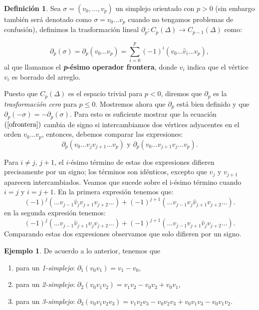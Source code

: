 \documentclass[12pt]{book}
\theoremstyle{definition}
\newtheorem{definition}[theorem]{Definición}
\newtheorem{example}[theorem]{Ejemplo}
\newcounter{in}
\newcounter{ini}
\begin{document}
\begin{definition}
  Sea $\sigma=(v_{0},\ldots ,v_{p})$ un simplejo orientado con $p>0$
  (sin embargo también será denotado como $\sigma=v_{0}\ldots v_{p}$
  cuando no tengamos problemas de confusión),
  definimos la trasformación lineal $\partial_{p}:C_{p}(\Delta)\rightarrow
  C_{p-1}(\Delta)$ como:

  \begin{equation}
    \label{ofrontera}
    \partial_{p}(\sigma)=\partial_{p}(v_{0}\ldots
    v_{p})=\sum^{p}_{i=0}(-1)^{i}(v_{0}\ldots \widehat v_{i}\ldots v_{p}),
  \end{equation}
  al que llamamos el \textbf{\emph{p}-ésimo operador frontera}, donde
  $\widehat v_{i}$ indica que el vértice $v_{i}$ es borrado del arreglo.
\end{definition}

Puesto que $C_{p}(\Delta)$ es el espacio trivial para $p<0$, diremos
que $\partial_{p}$ es la \textit{trasformación cero} para $p\leq
0$. Mostremos ahora que $\partial_{p}$ está bien definido y que
$\partial_{p}(-\sigma)=-\partial_{p}(\sigma)$. Para esto es suficiente
mostrar que la ecuación $(\ref{ofrontera})$ cambia de signo si intercambiamos dos
vértices adyacentes en el orden $v_{0}\ldots v_{p}$, entonces,
debemos comparar las expresiones:
$$\partial_{p}(v_{0}\ldots v_{j} v_{j+1} \ldots v_{p}) \mbox{ y } \partial_{p}(v_{0}\ldots v_{j+1} v_{j} \ldots v_{p}).$$

Para $i\neq j$, $j+1$, el $i$-ésimo término de estas dos expresiones
difieren precisamente por un signo; los términos son idénticos,
excepto que $v_{j}$ y $v_{j+1}$ aparecen intercambiados. Veamos que
sucede sobre el i-ésimo término cuando $i=j$ y $i=j+1$. En la primera
expresión tenemos que:
$$(-1)^{j}(\ldots v_{j-1} \widehat v_{j}v_{j+1}v_{j+2}\ldots)+(-1)^{j+1}(\ldots v_{j-1}v_{j}\widehat v_{j+1}v_{j+2}\ldots).$$
en la segunda expresión tenemos:
$$(-1)^{j}(\ldots v_{j-1}\widehat v_{j+1}v_{j}v_{j+2}\ldots)+(-1)^{j+1}(\ldots v_{j-1}v_{j+1}\widehat v_{j}v_{j+2}\ldots).$$
Comparando estas dos expresiones observamos que solo difieren por un signo.

\begin{example}
  De acuerdo a lo anterior, tenemos que
  \begin{enumerate}
  \item para un \emph{1-simplejo}: $\partial_{1}(v_{0}v_{1})= v_{1}-v_{0}$,
  \item para un \emph{2-simplejo}: $\partial_{2}(v_{0}v_{1}v_{2})=v_{1}v_{2}-v_{0}v_{2}+v_{0}v_{1}$,
  \item para un \emph{3-simplejo}:
    $\partial_{3}(v_{0}v_{1}v_{2}v_{3})=v_{1}v_{2}v_{3}-v_{0}v_{2}v_{3}+v_{0}v_{1}v_{3}-v_{0}v_{1}v_{2}$. 
  \end{enumerate}
\end{example}
\end{document}
